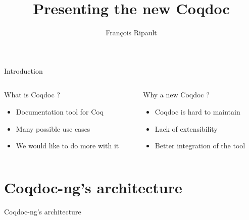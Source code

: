 \documentclass[compress]{beamer}
\title{Presenting the new Coqdoc}
\author{François Ripault}
\begin{document}
\begin{frame}
\titlepage
\end{frame}

\begin{frame}{Introduction}
  \begin{columns}[2]

    \begin{column}{0.5\textwidth}
      What is Coqdoc ?
      \begin{itemize}
        \item Documentation tool for Coq
        \item Many possible use cases
        \item We would like to do more with it
      \end{itemize}
    \end{column}

    \begin{column}{0.5\textwidth}
      Why a new Coqdoc ?
      \begin{itemize}
        \item Coqdoc is hard to maintain
        \item Lack of extensibility
        \item Better integration of the tool
      \end{itemize}
    \end{column}

  \end{columns}
\end{frame}

\begin{frame}
    \tableofcontents
\end{frame}

\section{Coqdoc-ng's architecture}
  \begin{frame}{Coqdoc-ng's architecture}
    
  \end{frame}
\end{document}
